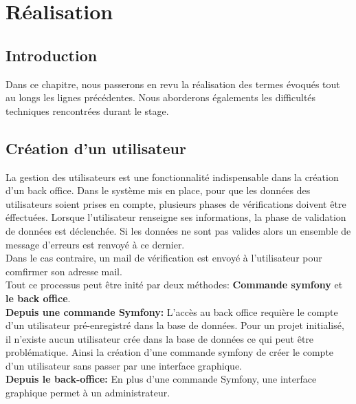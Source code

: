 \chapter{Réalisation}
	\section{Introduction}
		Dans ce chapitre, nous passerons en revu la réalisation des termes évoqués tout au longs les lignes précédentes. Nous aborderons égalements les difficultés techniques rencontrées durant le stage.
	\section{Création d'un utilisateur}
	La gestion des utilisateurs est une fonctionnalité indispensable dans la création d'un back office. Dans le système mis en place, pour que les données des utilisateurs soient prises en compte, plusieurs phases de vérifications doivent être éffectuées. Lorsque l'utilisateur renseigne ses informations, la phase de validation de données est déclenchée. Si les données ne sont pas valides alors un ensemble de message d'erreurs est renvoyé à ce dernier.\\
	Dans le cas contraire, un mail de vérification est envoyé à l'utilisateur pour comfirmer son adresse mail.\\
	Tout ce processus peut être inité par deux méthodes: \textbf{Commande symfony} et \textbf{le back office}.\\
	
		\textbf{Depuis une commande Symfony: } L'accès au back office requière le compte d'un utilisateur pré-enregistré dans la base de données.
			Pour un projet initialisé, il n'existe aucun utilisateur crée dans la base de données ce qui peut être problématique. Ainsi la création d'une commande symfony de créer le compte d'un utilisateur sans passer par une interface graphique.\\
			
		\textbf{Depuis le back-office: } En plus d'une commande Symfony, une interface graphique permet à un administrateur.
